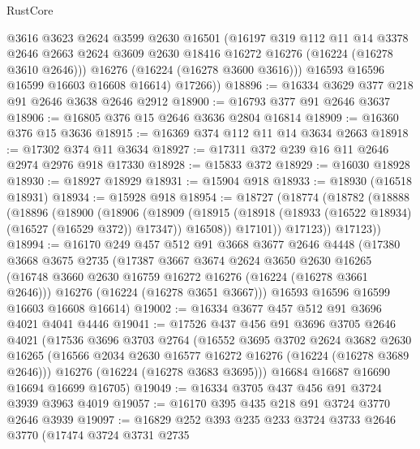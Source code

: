 \begin{lexlean}{RustCore}
\begin{coremodule}
            @3616
            @3623
            @2624
            @3599
            @2630
            @16501
            (@16197
              @319
              @112
              @11
              @14
              @3378
              @2646
              @2663
              @2624
              @3609
              @2630
              @18416
              @16272
              @16276
              (@16224 (@16278 @3610 @2646)))
            @16276
            (@16224 (@16278 @3600 @3616)))
          @16593
          @16596
          @16599
          @16603
          @16608
          @16614)
        @17266))
@18896 := @16334 @3629 @377 @218 @91 @2646 @3638 @2646 @2912
@18900 := @16793 @377 @91 @2646 @3637
@18906 := @16805 @376 @15 @2646 @3636 @2804 @16814
@18909 := @16360 @376 @15 @3636
@18915 := @16369 @374 @112 @11 @14 @3634 @2663
@18918 := @17302 @374 @11 @3634
@18927 := @17311 @372 @239 @16 @11 @2646 @2974 @2976 @918 @17330
@18928 := @15833 @372
@18929 := @16030 @18928
@18930 := @18927 @18929
@18931 := @15904 @918
@18933 := @18930 (@16518 @18931)
@18934 := @15928 @918
@18954 := @18727
    (@18774
      (@18782
        (@18888
          (@18896
            (@18900
              (@18906
                (@18909
                  (@18915 (@18918 (@18933 (@16522 @18934) (@16527 (@16529 @372)) @17347)) @16508))
                @17101))
            @17123))
        @17123))
@18994 := @16170
    @249
    @457
    @512
    @91
    @3668
    @3677
    @2646
    @4448
    (@17380
      @3668
      @3675
      @2735
      (@17387
        @3667
        @3674
        @2624
        @3650
        @2630
        @16265
        (@16748 @3660 @2630 @16759 @16272 @16276 (@16224 (@16278 @3661 @2646)))
        @16276
        (@16224 (@16278 @3651 @3667)))
      @16593
      @16596
      @16599
      @16603
      @16608
      @16614)
@19002 := @16334 @3677 @457 @512 @91 @3696 @4021 @4041 @4446
@19041 := @17526
    @437
    @456
    @91
    @3696
    @3705
    @2646
    @4021
    (@17536
      @3696
      @3703
      @2764
      (@16552
        @3695
        @3702
        @2624
        @3682
        @2630
        @16265
        (@16566 @2034 @2630 @16577 @16272 @16276 (@16224 (@16278 @3689 @2646)))
        @16276
        (@16224 (@16278 @3683 @3695)))
      @16684
      @16687
      @16690
      @16694
      @16699
      @16705)
@19049 := @16334 @3705 @437 @456 @91 @3724 @3939 @3963 @4019
@19057 := @16170 @395 @435 @218 @91 @3724 @3770 @2646 @3939
@19097 := @16829
    @252
    @393
    @235
    @233
    @3724
    @3733
    @2646
    @3770
    (@17474
      @3724
      @3731
      @2735

\end{coremodule}
\end{lexlean}
